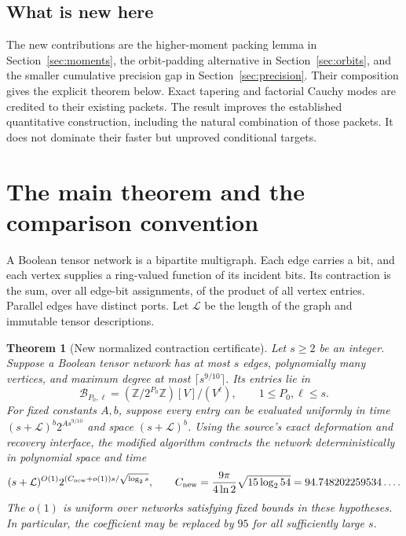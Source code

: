 \documentclass[11pt]{article}
\newtheorem{theorem}{Theorem}[section]
\theoremstyle{remark}\newtheorem{remark}[theorem]{Remark}
\newcommand{\LL}{\mathcal L}
\newcommand{\Cnew}{C_{\rm new}}
\newcommand{\lp}{\log_2}
\begin{document}
\subsection{What is new here}
The new contributions are the higher-moment packing lemma in Section~\ref{sec:moments}, the orbit-padding alternative in Section~\ref{sec:orbits}, and the smaller cumulative precision gap in Section~\ref{sec:precision}. Their composition gives the explicit theorem below. Exact tapering and factorial Cauchy modes are credited to their existing packets. The result improves the established quantitative construction, including the natural combination of those packets. It does not dominate their faster but unproved conditional targets.

\clearpage
\section{The main theorem and the comparison convention}
\label{sec:main}

A Boolean tensor network is a bipartite multigraph. Each edge carries a bit, and each vertex supplies a ring-valued function of its incident bits. Its contraction is the sum, over all edge-bit assignments, of the product of all vertex entries. Parallel edges have distinct ports. Let $\LL$ be the length of the graph and immutable tensor descriptions.

\begin{theorem}[New normalized contraction certificate]
\label{thm:main}
Let $s\ge2$ be an integer. Suppose a Boolean tensor network has at most $s$ edges, polynomially many vertices, and maximum degree at most $\lceil s^{9/10}\rceil$. Its entries lie in
\[
 \mathcal B_{P_0,\ell}=(\mathbb Z/2^{P_0}\mathbb Z)[V]/(V^\ell),
 \qquad 1\le P_0,\ell\le s.
\]
For fixed constants $A,b$, suppose every entry can be evaluated uniformly in time $(s+\LL)^b2^{As^{9/10}}$ and space $(s+\LL)^b$. Using the source's exact deformation and recovery interface, the modified algorithm contracts the network deterministically in polynomial space and time
\begin{equation}
 (s+\LL)^{O(1)}
 2^{(\Cnew+o(1))s/\sqrt{\lp s}},
 \qquad
 \Cnew=\frac{9\pi}{4\ln2}\sqrt{15\lp54}
 =94.748202259534\ldots .
 \label{eq:main}
\end{equation}
The $o(1)$ is uniform over networks satisfying fixed bounds in these hypotheses. In particular, the coefficient may be replaced by $95$ for all sufficiently large $s$.
\end{theorem}
\end{document}
